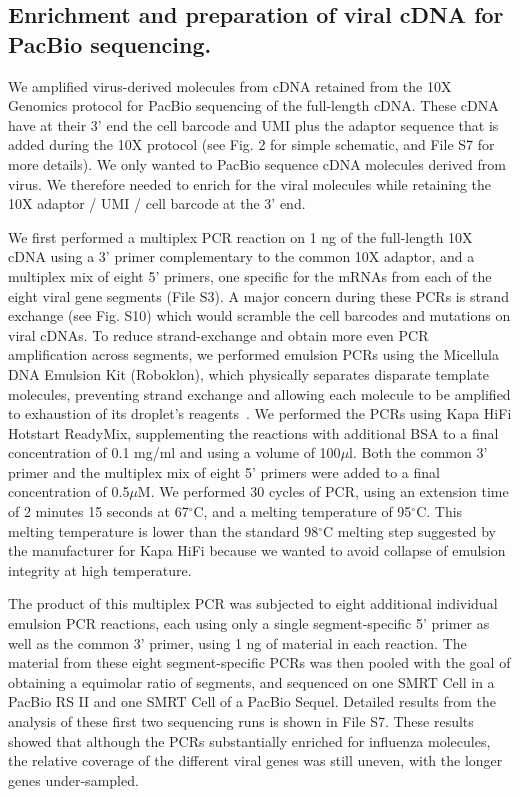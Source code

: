 \documentclass[]{article}
\begin{document}
\subsection*{Enrichment and preparation of viral cDNA for PacBio sequencing.}
We amplified virus-derived molecules from cDNA retained from the 10X Genomics protocol for PacBio sequencing of the full-length cDNA.
These cDNA have at their 3' end the cell barcode and UMI plus the adaptor sequence that is added during the 10X protocol (see Fig. 2 for simple schematic, and File S7 for more details). 
We only wanted to PacBio sequence cDNA molecules derived from virus.
We therefore needed to enrich for the viral molecules while retaining the 10X adaptor / UMI / cell barcode at the 3' end.

We first performed a multiplex PCR reaction on 1 ng of the full-length 10X cDNA using a 3' primer complementary to the common 10X adaptor, and a multiplex mix of eight 5' primers, one specific for the mRNAs from each of the eight viral gene segments (File S3).
A major concern during these PCRs is strand exchange (see Fig. S10) which would scramble the cell barcodes and mutations on viral cDNAs.
To reduce strand-exchange and obtain more even PCR amplification across segments, we performed emulsion PCRs using the Micellula DNA Emulsion Kit (Roboklon), which physically separates disparate template molecules, preventing strand exchange and allowing each molecule to be amplified to exhaustion of its droplet's reagents~\cite{boers2015micelle}.
We performed the PCRs using Kapa HiFi Hotstart ReadyMix, supplementing the reactions with additional BSA to a final concentration of 0.1 mg/ml and using a volume of 100$\mu$l.
Both the common 3' primer and the multiplex mix of eight 5' primers were added to a final concentration of 0.5$\mu$M.
We performed 30 cycles of PCR, using an extension time of 2 minutes 15 seconds at 67$^{\circ}$C, and a melting temperature of 95$^{\circ}$C.
This melting temperature is lower than the standard 98$^{\circ}$C melting step suggested by the manufacturer for Kapa HiFi because we wanted to avoid collapse of emulsion integrity at high temperature.

The product of this multiplex PCR was subjected to eight additional individual emulsion PCR reactions, each using only a single segment-specific 5' primer as well as the common 3' primer, using 1 ng of material in each reaction.
The material from these eight segment-specific PCRs was then pooled with the goal of obtaining a equimolar ratio of segments, and sequenced on one SMRT Cell in a PacBio RS II and one SMRT Cell of a PacBio Sequel. 
Detailed results from the analysis of these first two sequencing runs is shown in File S7.
These results showed that although the PCRs substantially enriched for influenza molecules, the relative coverage of the different viral genes was still uneven, with the longer genes under-sampled.
\end{document}
